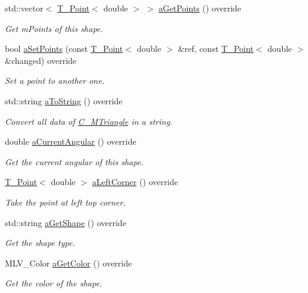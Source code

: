 \begin{DoxyCompactItemize}
std\+::vector$<$ \hyperlink{classT__Point}{T\+\_\+\+Point}$<$ double $>$ $>$ \hyperlink{classC__MTriangle_ada409f8f1015cf7bf9f9ab8fb11da94b}{a\+Get\+Points} () override
\begin{DoxyCompactList}\small\item\em Get m\+Points of this shape. \end{DoxyCompactList}\item 
bool \hyperlink{classC__MTriangle_a5a3971eb0aafc16e5a34bd94130d7c6b}{a\+Set\+Points} (const \hyperlink{classT__Point}{T\+\_\+\+Point}$<$ double $>$ \&ref, const \hyperlink{classT__Point}{T\+\_\+\+Point}$<$ double $>$ \&changed) override
\begin{DoxyCompactList}\small\item\em Set a point to another one. \end{DoxyCompactList}\item 
std\+::string \hyperlink{classC__MTriangle_a3a769eb21278ec456292d88385b332a2}{a\+To\+String} () override
\begin{DoxyCompactList}\small\item\em Convert all data of \hyperlink{classC__MTriangle}{C\+\_\+\+M\+Triangle} in a string. \end{DoxyCompactList}\item 
double \hyperlink{classC__MTriangle_aad1e42f1ec9c486736a403128ba47179}{a\+Current\+Angular} () override
\begin{DoxyCompactList}\small\item\em Get the current angular of this shape. \end{DoxyCompactList}\item 
\hyperlink{classT__Point}{T\+\_\+\+Point}$<$ double $>$ \hyperlink{classC__MTriangle_ad077fce026711bf0a25fc4c1cb83ecb9}{a\+Left\+Corner} () override
\begin{DoxyCompactList}\small\item\em Take the point at left top corner. \end{DoxyCompactList}\item 
std\+::string \hyperlink{classC__MTriangle_aca7e38c6bf9695aacf54aa03ecfba978}{a\+Get\+Shape} () override
\begin{DoxyCompactList}\small\item\em Get the shape type. \end{DoxyCompactList}\item 
M\+L\+V\+\_\+\+Color \hyperlink{classC__MTriangle_aa567d77ce0e6d664beb6eea9268b1bc3}{a\+Get\+Color} () override
\begin{DoxyCompactList}\small\item\em Get the color of the shape. \end{DoxyCompactList}\item 

\end{DoxyCompactItemize}
